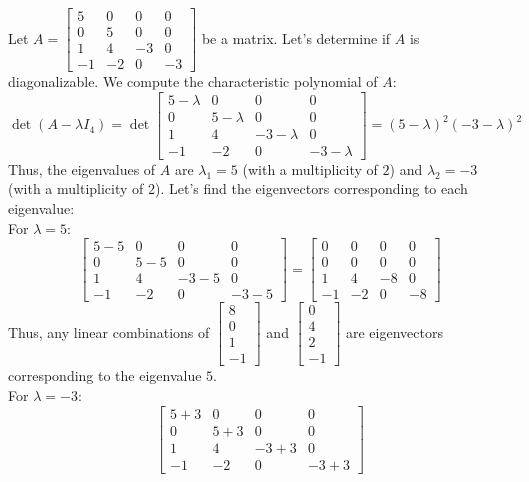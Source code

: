 \begin{eg}
    Let $A = \begin{bmatrix}
        5 & 0 & 0 & 0 \\ 0 & 5 & 0 & 0 \\ 1 & 4 & -3 & 0 \\ -1 & -2 & 0 & -3
    \end{bmatrix}$ be a matrix. Let's determine if $A$ is diagonalizable. We compute the characteristic polynomial of $A$:
    \[\det(A - \lambda I_4) = \det\begin{bmatrix}
        5 - \lambda & 0 & 0 & 0 \\ 0 & 5 - \lambda & 0 & 0 \\ 1 & 4 & -3 - \lambda & 0 \\ -1 & -2 & 0 & -3 - \lambda
    \end{bmatrix} = (5 - \lambda)^2 (-3 - \lambda)^2\]
    Thus, the eigenvalues of $A$ are $\lambda_1 = 5$ (with a multiplicity of $2$) and $\lambda_2 = -3$ (with a multiplicity of $2$). Let's find the eigenvectors corresponding to each eigenvalue: \\
    For $\lambda = 5$:
    \[\begin{bmatrix}
        5 - 5 & 0 & 0 & 0 \\ 0 & 5 - 5 & 0 & 0 \\ 1 & 4 & -3 - 5 & 0 \\ -1 & -2 & 0 & -3 - 5
    \end{bmatrix} = \begin{bmatrix}
        0 & 0 & 0 & 0 \\ 0 & 0 & 0 & 0 \\ 1 & 4 & -8 & 0 \\ -1 & -2 & 0 & -8
    \end{bmatrix}\]
    Thus, any linear combinations of $\begin{bmatrix}
        8 \\ 0 \\ 1 \\ -1
    \end{bmatrix}$ and $\begin{bmatrix}
        0 \\ 4 \\ 2 \\ -1
    \end{bmatrix}$ are eigenvectors corresponding to the eigenvalue $5$. \\
    For $\lambda = -3$:
    \[\begin{bmatrix}
        5 + 3 & 0 & 0 & 0 \\ 0 & 5 + 3 & 0 & 0 \\ 1 & 4 & -3 + 3 & 0 \\ -1 & -2 & 0 & -3 + 3

\end{bmatrix}\]
\end{eg}
